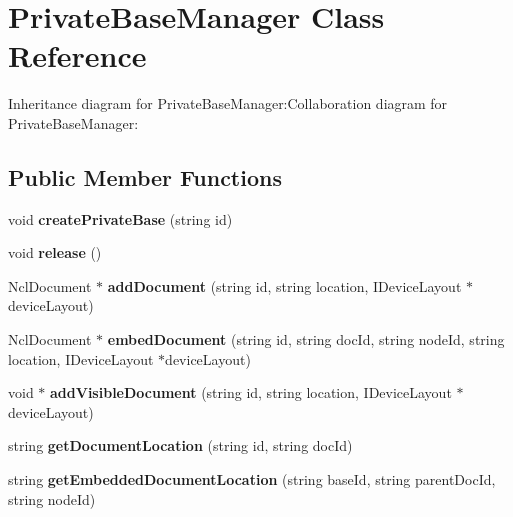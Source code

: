 \section{PrivateBaseManager Class Reference}
\label{classbr_1_1pucrio_1_1telemidia_1_1ginga_1_1ncl_1_1PrivateBaseManager}
Inheritance diagram for PrivateBaseManager:Collaboration diagram for PrivateBaseManager:\subsection*{Public Member Functions}
\begin{CompactItemize}
\item 
void \textbf{createPrivateBase} (string id)\label{classbr_1_1pucrio_1_1telemidia_1_1ginga_1_1ncl_1_1PrivateBaseManager_0dce35539707ed546bc00c8c0ad63cb3}

\item 
void \textbf{release} ()\label{classbr_1_1pucrio_1_1telemidia_1_1ginga_1_1ncl_1_1PrivateBaseManager_23b477d0e2d399f75d585d154c346591}

\item 
NclDocument $\ast$ \textbf{addDocument} (string id, string location, IDeviceLayout $\ast$deviceLayout)\label{classbr_1_1pucrio_1_1telemidia_1_1ginga_1_1ncl_1_1PrivateBaseManager_311d24045dd8019e9b62bd7e019ad1b7}

\item 
NclDocument $\ast$ \textbf{embedDocument} (string id, string docId, string nodeId, string location, IDeviceLayout $\ast$deviceLayout)\label{classbr_1_1pucrio_1_1telemidia_1_1ginga_1_1ncl_1_1PrivateBaseManager_185634d4d10fa6f434952cb0d503603b}

\item 
void $\ast$ \textbf{addVisibleDocument} (string id, string location, IDeviceLayout $\ast$deviceLayout)\label{classbr_1_1pucrio_1_1telemidia_1_1ginga_1_1ncl_1_1PrivateBaseManager_5dfb8fd79804628f72ed4c2ed127894c}

\item 
string \textbf{getDocumentLocation} (string id, string docId)\label{classbr_1_1pucrio_1_1telemidia_1_1ginga_1_1ncl_1_1PrivateBaseManager_cb376e2e4ad6676f985b8f5ea7005c27}

\item 
string \textbf{getEmbeddedDocumentLocation} (string baseId, string parentDocId, string nodeId)\label{classbr_1_1pucrio_1_1telemidia_1_1ginga_1_1ncl_1_1PrivateBaseManager_1495c69b9f7bec89d194d79f864741d2}


\end{CompactItemize}
